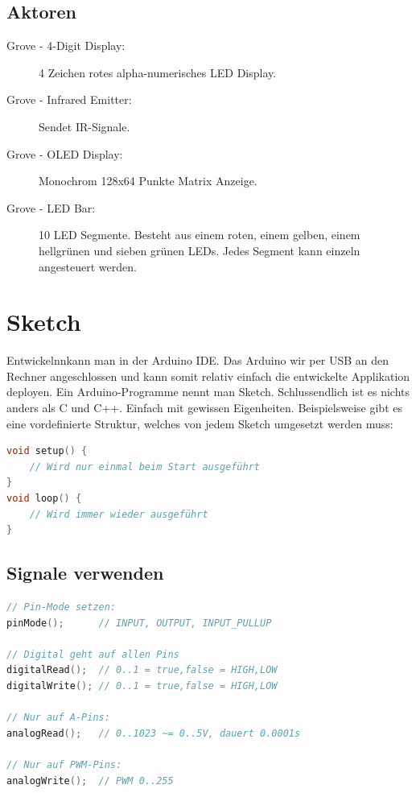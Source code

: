 \subsection{Aktoren}
\begin{description}
	\item[Grove - 4-Digit Display:] 4 Zeichen rotes alpha-numerisches LED Display.
	\item[Grove - Infrared Emitter:] Sendet IR-Signale.
	\item[Grove - OLED Display:] Monochrom 128x64 Punkte Matrix Anzeige.
	\item[Grove - LED Bar:] 10 LED Segmente. Besteht aus einem roten, einem gelben, einem hellgrünen und sieben	grünen LEDs. Jedes Segment kann einzeln angesteuert werden.
\end{description}

\section{Sketch}
Entwickelnnkann man in der Arduino IDE. Das Arduino wir per USB an den Rechner angeschlossen und kann somit relativ einfach die entwickelte Applikation deployen. Ein Arduino-Programme nennt man Sketch. Schlussendlich ist es nichts anders als C und C++. Einfach mit gewissen Eigenheiten. Beispielsweise gibt es eine vordefinierte Struktur, welches von jedem Sketch umgesetzt werden muss:

\begin{lstlisting}[language=C, caption=Sketch Struktur]
void setup() {
	// Wird nur einmal beim Start ausgeführt
}
void loop() {
	// Wird immer wieder ausgeführt
}
\end{lstlisting}

\subsection{Signale verwenden}
\begin{lstlisting}[language=C, caption=Signale verwenden]
// Pin-Mode setzen:
pinMode(); 		// INPUT, OUTPUT, INPUT_PULLUP

// Digital geht auf allen Pins
digitalRead(); 	// 0..1 = true,false = HIGH,LOW
digitalWrite(); // 0..1 = true,false = HIGH,LOW

// Nur auf A-Pins:
analogRead(); 	// 0..1023 ~= 0..5V, dauert 0.0001s

// Nur auf PWM-Pins:
analogWrite(); 	// PWM 0..255
\end{lstlisting}

